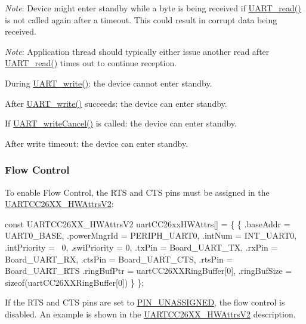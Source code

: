 \begin{DoxyItemize}
\begin{DoxyItemize}
\item {\itshape Note}\+: Device might enter standby while a byte is being received if \hyperlink{_u_a_r_t_8h_a023152d57539cad94bdd813956013e73}{U\+A\+R\+T\+\_\+read()} is not called again after a timeout. This could result in corrupt data being received.
\item {\itshape Note}\+: Application thread should typically either issue another read after \hyperlink{_u_a_r_t_8h_a023152d57539cad94bdd813956013e73}{U\+A\+R\+T\+\_\+read()} times out to continue reception.
\end{DoxyItemize}
\item During \hyperlink{_u_a_r_t_8h_a6f2a04c09dc17886e69e361cd80aaedc}{U\+A\+R\+T\+\_\+write()}\+: the device cannot enter standby.
\item After \hyperlink{_u_a_r_t_8h_a6f2a04c09dc17886e69e361cd80aaedc}{U\+A\+R\+T\+\_\+write()} succeeds\+: the device can enter standby.
\item If \hyperlink{_u_a_r_t_8h_a0482cd0ab9ee7e802c8e785a5754d16d}{U\+A\+R\+T\+\_\+write\+Cancel()} is called\+: the device can enter standby.
\item After write timeout\+: the device can enter standby.
\end{DoxyItemize}

\subsubsection*{Flow Control}

To enable Flow Control, the R\+T\+S and C\+T\+S pins must be assigned in the \hyperlink{struct_u_a_r_t_c_c26_x_x___h_w_attrs_v2}{U\+A\+R\+T\+C\+C26\+X\+X\+\_\+\+H\+W\+Attrs\+V2}\+: 
\begin{DoxyCode}
\textcolor{keyword}{const} UARTCC26XX_HWAttrsV2 uartCC26xxHWAttrs[] = \{
    \{
        .baseAddr    = UART0\_BASE,
        .powerMngrId = PERIPH\_UART0,
        .intNum      = INT\_UART0,
        .intPriority = ~0,
        .swiPriority = 0,
        .txPin       = Board\_UART\_TX,
        .rxPin       = Board\_UART\_RX,
        .ctsPin      = Board\_UART\_CTS,
        .rtsPin      = Board\_UART\_RTS
        .ringBufPtr  = uartCC26XXRingBuffer[0],
        .ringBufSize = \textcolor{keyword}{sizeof}(uartCC26XXRingBuffer[0])
    \}
\};
\end{DoxyCode}


If the R\+T\+S and C\+T\+S pins are set to \hyperlink{_p_i_n_8h_aba219226dfdc9ea2fb82d6a7995395bf}{P\+I\+N\+\_\+\+U\+N\+A\+S\+S\+I\+G\+N\+E\+D}, the flow control is disabled. An example is shown in the \hyperlink{struct_u_a_r_t_c_c26_x_x___h_w_attrs_v2}{U\+A\+R\+T\+C\+C26\+X\+X\+\_\+\+H\+W\+Attrs\+V2} description.

